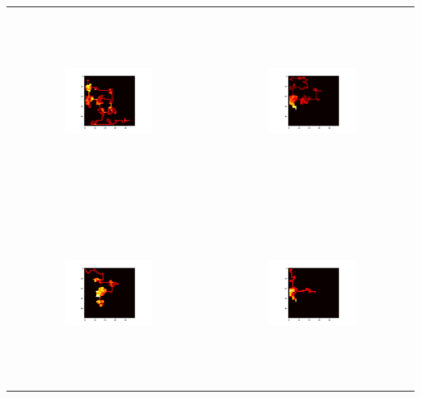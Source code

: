 \begin{table}[h!]
    \begin{center}
        \begin{tabular}{cc}
            \includegraphics[width=0.45\textwidth, height=60mm]{images/test1_agent1.png}
            & 
            \includegraphics[width=0.45\textwidth, height=60mm]{images/test2_agent1.png}    
            \\
            \includegraphics[width=0.45\textwidth, height=60mm]{images/test1_agent2.png}
            &
            \includegraphics[width=0.45\textwidth, height=60mm]{images/test2_agent2.png}

\end{tabular}
\end{center}
\end{table}
